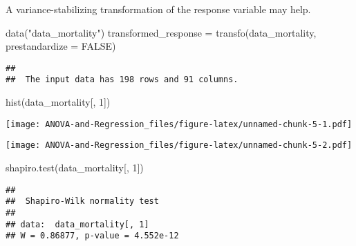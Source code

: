 \documentclass[
]{book}
\newenvironment{Shaded}{\begin{snugshade}}{\end{snugshade}}
\newcommand{\AttributeTok}[1]{\textcolor[rgb]{0.77,0.63,0.00}{#1}}
\newcommand{\ConstantTok}[1]{\textcolor[rgb]{0.00,0.00,0.00}{#1}}
\newcommand{\DecValTok}[1]{\textcolor[rgb]{0.00,0.00,0.81}{#1}}
\newcommand{\FunctionTok}[1]{\textcolor[rgb]{0.00,0.00,0.00}{#1}}
\newcommand{\NormalTok}[1]{#1}
\newcommand{\OtherTok}[1]{\textcolor[rgb]{0.56,0.35,0.01}{#1}}
\newcommand{\SpecialCharTok}[1]{\textcolor[rgb]{0.00,0.00,0.00}{#1}}
\newcommand{\StringTok}[1]{\textcolor[rgb]{0.31,0.60,0.02}{#1}}
\begin{document}
A variance-stabilizing transformation of the response variable may help.

\begin{Shaded}
\begin{Highlighting}[]
\FunctionTok{data}\NormalTok{(}\StringTok{"data\_mortality"}\NormalTok{)}
\NormalTok{transformed\_response }\OtherTok{=} \FunctionTok{transfo}\NormalTok{(data\_mortality, }\AttributeTok{prestandardize =} \ConstantTok{FALSE}\NormalTok{)}
\end{Highlighting}
\end{Shaded}

\begin{verbatim}
##  
##  The input data has 198 rows and 91 columns.
\end{verbatim}

\begin{Shaded}
\begin{Highlighting}[]
\FunctionTok{hist}\NormalTok{(data\_mortality[, }\DecValTok{1}\NormalTok{])}
\end{Highlighting}
\end{Shaded}

\texttt{[image: ANOVA-and-Regression\_files/figure-latex/unnamed-chunk-5-1.pdf]}

\begin{Shaded}
\end{Shaded}

\texttt{[image: ANOVA-and-Regression\_files/figure-latex/unnamed-chunk-5-2.pdf]}

\begin{Shaded}
\begin{Highlighting}[]
\FunctionTok{shapiro.test}\NormalTok{(data\_mortality[, }\DecValTok{1}\NormalTok{])}
\end{Highlighting}
\end{Shaded}

\begin{verbatim}
## 
##  Shapiro-Wilk normality test
## 
## data:  data_mortality[, 1]
## W = 0.86877, p-value = 4.552e-12
\end{verbatim}

\begin{Shaded}
\end{Shaded}
\end{document}
